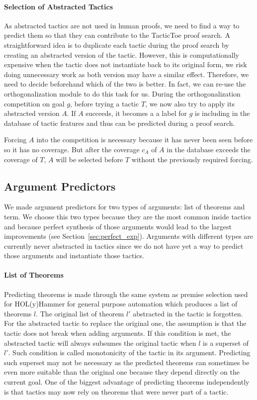 \documentclass[runningheads,a4paper,draft]{svjour3}
\def\holyhammer{\textsf{HOL(y)Hammer}\xspace}
\def\tactictoe{\textsf{TacticToe}\xspace}
\begin{document}
\paragraph{Selection of Abstracted Tactics}
As abstracted tactics are not used in human proofs, we need to find a way to 
predict them so that they can contribute to the \tactictoe proof search.
A straightforward idea is to duplicate each tactic during the proof search by 
creating an abstracted version of the tactic. However, this is computationally 
expensive when the tactic does not instantiate back to its original form, we 
risk doing unnecessary work as both version may have a similar effect.
Therefore, we need to decide beforehand which of the two is better.
In fact, we can re-use the orthogonalization module to do this task for us.
During the orthogonalization competition on goal $g$, before trying a tactic 
$T$, we now also try to apply its abstracted version $A$. If $A$ succeeds, it 
becomes a a label for $g$ is including in the database of tactic features and 
thus can be predicted during a proof search.


\begin{remark}
Forcing $A$ into the competition is necessary because it has never been seen 
before so it has no coverage. But after the coverage $c_A$ of $A$ in the 
database exceeds the coverage of $T$, $A$ will be selected before $T$ without 
the 
previously required forcing.
\end{remark}


\subsection{Argument Predictors}\label{sec:arg_pred}
We made argument predictors for two types of arguments: list 
of theorems and term. We choose this two types because they are the most common 
inside tactics and because perfect synthesis of those arguments would lead to 
the largest improvements (see Section~\ref{sec:perfect_exp}). Arguments with 
different types 
are currently never abstracted in tactics since we do 
not have yet a way to predict those arguments and instantiate those tactics.

\paragraph{List of Theorems}
Predicting theorems is made through the same system as premise selection
used for \holyhammer for general purpose automation which produces a list of 
theorems $l$. The original list of theorem $l'$ abstracted in the tactic is 
forgotten. For the abstracted tactic 
to replace the original one, the assumption is that the tactic does not break 
when adding arguments. If this condition is met, the abstracted tactic will 
always subsumes the original tactic when $l$ is a superset of $l'$. Such 
condition is called monotonicity of the 
tactic in its argument. Predicting such superset may not be necessary as the  
predicted theorems can sometimes be even more suitable than the original one 
because they depend directly on the current goal. One of the biggest advantage 
of predicting theorems independently is that tactics may now rely on theorems 
that were never part of a tactic.
\end{document}
